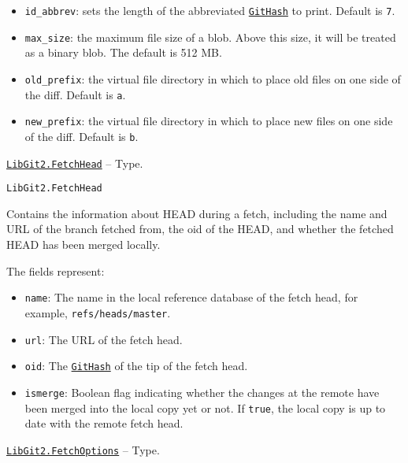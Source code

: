 \begin{adjustwidth}{2em}{0pt}
\begin{itemize}
\item \texttt{id\_abbrev}: sets the length of the abbreviated \hyperlink{202290709580230708}{\texttt{GitHash}} to print.  Default is \texttt{7}.


\item \texttt{max\_size}: the maximum file size of a blob. Above this size, it will be treated  as a binary blob. The default is 512 MB.


\item \texttt{old\_prefix}: the virtual file directory in which to place old files on one side  of the diff. Default is \texttt{{\textquotedbl}a{\textquotedbl}}.


\item \texttt{new\_prefix}: the virtual file directory in which to place new files on one side  of the diff. Default is \texttt{{\textquotedbl}b{\textquotedbl}}.

\end{itemize}


\end{adjustwidth}
\hypertarget{17806809481919147110}{}
\hyperlink{17806809481919147110}{\texttt{LibGit2.FetchHead}}  -- {Type.}

\begin{adjustwidth}{2em}{0pt}


\begin{verbatim}
LibGit2.FetchHead
\end{verbatim}

Contains the information about HEAD during a fetch, including the name and URL of the branch fetched from, the oid of the HEAD, and whether the fetched HEAD has been merged locally.

The fields represent:

\begin{itemize}
\item \texttt{name}: The name in the local reference database of the fetch head, for example,  \texttt{{\textquotedbl}refs/heads/master{\textquotedbl}}.


\item \texttt{url}: The URL of the fetch head.


\item \texttt{oid}: The \hyperlink{202290709580230708}{\texttt{GitHash}} of the tip of the fetch head.


\item \texttt{ismerge}: Boolean flag indicating whether the changes at the  remote have been merged into the local copy yet or not. If \texttt{true}, the local  copy is up to date with the remote fetch head.

\end{itemize}


\end{adjustwidth}
\hypertarget{7474664468985945267}{}
\hyperlink{7474664468985945267}{\texttt{LibGit2.FetchOptions}}  -- {Type.}

